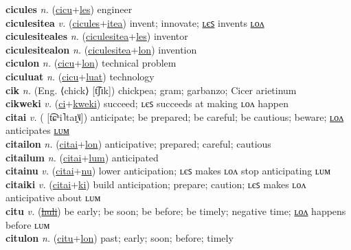 \textbf{cicules} \textit{n.} (\hyperref[cicu]{cicu}+\hyperref[les]{les})
engineer \label{cicules} \\
\textbf{ciculesitea} \textit{v.} (\hyperref[cicules]{cicules}+\hyperref[itea]{itea})
invent; innovate; \hyperref[ciculesiteales]{ʟєꜱ} invents \hyperref[ciculesitealon]{ʟᴏᴧ} \label{ciculesitea} \\
\textbf{ciculesiteales} \textit{n.} (\hyperref[ciculesitea]{ciculesitea}+\hyperref[les]{les})
inventor \label{ciculesiteales} \\
\textbf{ciculesitealon} \textit{n.} (\hyperref[ciculesitea]{ciculesitea}+\hyperref[lon]{lon})
invention \label{ciculesitealon} \\
\textbf{ciculon} \textit{n.} (\hyperref[cicu]{cicu}+\hyperref[lon]{lon})
technical problem \label{ciculon} \\
\textbf{ciculuat} \textit{n.} (\hyperref[cicu]{cicu}+\hyperref[luat]{luat})
technology \label{ciculuat} \\
\textbf{cik} \textit{n.} (Eng. ⟨chick⟩ [t͡ʃɪk])
chickpea; gram; garbanzo; Cicer arietinum \label{cik} \\
\textbf{cikweki} \textit{v.} (\hyperref[ci]{ci}+\hyperref[kweki]{kweki})
succeed; ʟєꜱ succeeds at making ʟᴏᴧ happen \label{cikweki} \\
\textbf{citai} \textit{v.} ( [t͡ɕʰi˥taɪ̯˥˩])
anticipate; be prepared; be careful; be cautious; beware; \hyperref[citailon]{ʟᴏᴧ} anticipates \hyperref[citailum]{ʟᴜᴍ} \label{citai} \\
\textbf{citailon} \textit{n.} (\hyperref[citai]{citai}+\hyperref[lon]{lon})
anticipative; prepared; careful; cautious \label{citailon} \\
\textbf{citailum} \textit{n.} (\hyperref[citai]{citai}+\hyperref[lum]{lum})
anticipated \label{citailum} \\
\textbf{citainu} \textit{v.} (\hyperref[citai]{citai}+\hyperref[nu]{nu})
lower anticipation; ʟєꜱ makes ʟᴏᴧ stop anticipating ʟᴜᴍ \label{citainu} \\
\textbf{citaiki} \textit{v.} (\hyperref[citai]{citai}+\hyperref[ki]{ki})
build anticipation; prepare; caution; ʟєꜱ makes ʟᴏᴧ anticipative about ʟᴜᴍ \label{citaiki} \\
\textbf{citu} \textit{v.} (\hyperref[huli]{\sout{huli}})
be early; be soon; be before; be timely; negative time; \hyperref[citulon]{ʟᴏᴧ} happens before ʟᴜᴍ \label{citu} \\
\textbf{citulon} \textit{n.} (\hyperref[citu]{citu}+\hyperref[lon]{lon})
past; early; soon; before; timely \label{citulon} \\
